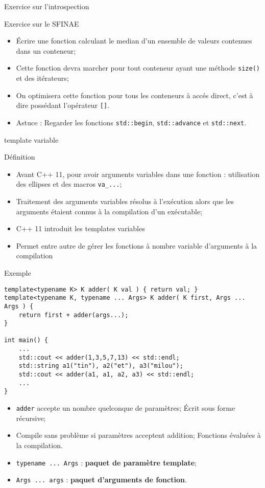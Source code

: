 \documentclass[handout,10pt]{beamer}
\begin{document}
\begin{frame}[fragile]{Exercice sur l'introspection}

\begin{exampleblock}{Exercice sur le SFINAE}
\begin{itemize}
\item \'Ecrire une fonction calculant le median d'un ensemble de valeurs contenues dans un conteneur;
\item Cette fonction devra marcher pour tout conteneur ayant une méthode \lstinline$size()$ et des itérateurs;
\item On optimisera cette fonction pour tous les conteneurs à accés direct, c'est à dire possédant l'opérateur \lstinline$[]$.
\item \alert{Astuce} : Regarder les fonctions \lstinline{std::begin}, \lstinline{std::advance} et \lstinline{std::next}.
\end{itemize}
\end{exampleblock}
\end{frame}

\begin{frame}[fragile]{template variable}
\tiny
\begin{block}{Définition}
\begin{itemize}
\item Avant C++ 11, pour avoir arguments variables dans une fonction :  utilisation  des ellipses et des macros \lstinline$va_...$;
\item Traitement des arguments variables résolus à l'exécution alors que les arguments étaient connus à la compilation d'un exécutable;
\item C++ 11 introduit les templates variables
\item Permet entre autre de gérer les fonctions à nombre variable d'arguments à la compilation
\end{itemize}
\end{block}

\begin{exampleblock}{Exemple}
\begin{lstlisting}
template<typename K> K adder( K val ) { return val; }
template<typename K, typename ... Args> K adder( K first, Args ... Args ) {
    return first + adder(args...);
}

int main() {
    ...
    std::cout << adder(1,3,5,7,13) << std::endl;
    std::string a1("tin"), a2("et"), a3("milou");
    std::cout << adder(a1, a1, a2, a3) << std::endl;
    ...
}
\end{lstlisting}
\begin{itemize}
\item \lstinline$adder$ accepte un nombre quelconque de paramètres; \'Ecrit sous forme récursive;
\item Compile sans problème si paramètres acceptent addition; Fonctions évaluées à la compilation.
\item \lstinline$typename ... Args$ : \textbf{paquet de paramètre template};
\item \lstinline$Args ... args$ : \textbf{paquet d'arguments de fonction}.
\end{itemize}
\end{exampleblock}
\end{frame}
\end{document}
